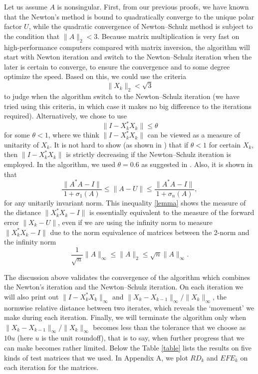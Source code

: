 \documentclass[12pt]{article}
\def\norm#1{\|#1\|}
\begin{document}
Let us assume $A$ is nonsingular. First, from our previous proofs, we have known that the Newton's method is bound to quadratically converge to the unique polar factor $U$, while the quadratic convergence of Newton--Schulz method is subject to the condition that $\norm{A}_2<3$. Because matrix multiplication is very fast on high-performance computers compared with matrix inversion, the algorithm will start with Newton iteration and switch to the Newton--Schulz iteration when the later is certain to converge, to ensure the convergence and to some degree optimize the speed. Based on this, we could use the criteria 
$$
\norm{X_k}_2 < \sqrt{3}
$$
to judge when the algorithm switch to the Newton--Schulz iteration (we have tried using this criteria, in which case it makes no big difference to the iterations required). Alternatively, we chose to use 
\begin{equation} \label{criteria}
\norm{I-X_k^*{X_k}}\le \theta
\end{equation}
for some $\theta <1$, where we think $\norm{I-X_k^*{X_k}}$ can be viewed as a measure of unitarity of $X_k$. It is not hard to show (as shown in \cite{hisc90}) that if $\theta<1$ for certain $X_k$, then $\norm{I-X_k^*{X_k}}$ is strictly decreasing if the Newton--Schulz iteration is employed. In the algorithm, we used $\theta=0.6$ as suggested in \cite{hisc90}. Also, it is shown in \cite[Lem.~8.17]{high:FM} that
\begin{equation} \label{lemma}
\frac{\norm{A^*A-I}}{1+\sigma_1(A)}\le \norm{A-U} \le \frac{\norm{A^*A-I}}{1+\sigma_n(A)},
\end{equation}
for any unitarily invariant norm. This inequality \eqref{lemma} shows the measure of the distance $\norm{X_k^*{X_k}-I}$ is essentially equivalent to the measure of the forward error $\norm{X_k-U}$, even if we are using the infinity norm to measure $\norm{X_k^*{X_k}-I}$ due to the norm equivalence of matrices between the 2-norm and the infinity norm
$$
\frac{1}{\sqrt{n}}\norm{A}_\infty\le\norm{A}_2\le\sqrt{n}\norm{A}_\infty.
$$

The discussion above validates the convergence of the algorithm which combines the Newton's iteration and the Newton--Schulz iteration. On each iteration we will also print out $\norm{I-X_k^*{X_k}}_\infty$ and $\norm{X_k-X_{k-1}}_\infty/\norm{X_k}_\infty$, the normwise relative distance between two iterates, which reveals the `movement' we make during each iteration. Finally, we will terminate the algorithm only when $\norm{X_k-X_{k-1}}_\infty/\norm{X_k}_\infty$ becomes less than the tolerance that we choose as $10u$ (here $u$ is the unit roundoff), that is to say, when further progress that we can make becomes rather limited. Below the Table \ref{table} lists the results on five kinds of test matrices that we used. In Appendix A, we plot $RD_k$ and $EFE_k$ on each iteration for the matrices. 
\end{document}
